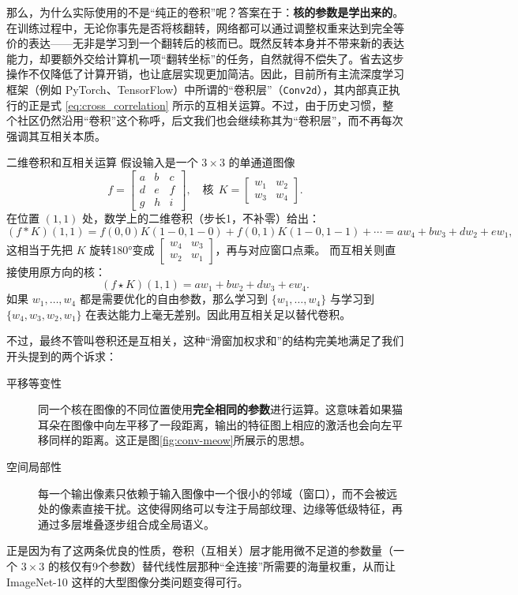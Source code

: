 \begin{framed}{}
那么，为什么实际使用的不是“纯正的卷积”呢？答案在于：\textbf{核的参数是学出来的}。在训练过程中，无论你事先是否将核翻转，网络都可以通过调整权重来达到完全等价的表达——无非是学习到一个翻转后的核而已。既然反转本身并不带来新的表达能力，却要额外交给计算机一项“翻转坐标”的任务，自然就得不偿失了。省去这步操作不仅降低了计算开销，也让底层实现更加简洁。因此，目前所有主流深度学习框架（例如 PyTorch、TensorFlow）中所谓的“卷积层”（\texttt{Conv2d}），其内部真正执行的正是式 \eqref{eq:cross_correlation} 所示的互相关运算\cite{dumoulin2018guideconvolutionarithmeticdeep}。不过，由于历史习惯，整个社区仍然沿用“卷积”这个称呼，后文我们也会继续称其为“卷积层”，而不再每次强调其互相关本质。
\end{framed}


\begin{example}{二维卷积和互相关运算}{}
假设输入是一个 $3\times 3$ 的单通道图像
\[
f = \begin{bmatrix}
a & b & c \\
d & e & f \\
g & h & i
\end{bmatrix}, \quad
\text{核}~~K = \begin{bmatrix}
w_1 & w_2 \\
w_3 & w_4
\end{bmatrix}.
\]
在位置 $(1,1)$ 处，数学上的二维卷积（步长1，不补零）给出：
\[
(f * K)(1,1) = f(0,0)K(1-0,1-0) + f(0,1)K(1-0,1-1) + \cdots 
= a w_4 + b w_3 + d w_2 + e w_1,
\]
这相当于先把 $K$ 旋转180°变成 $ \begin{bmatrix} w_4 & w_3 \\ w_2 & w_1 \end{bmatrix} $，再与对应窗口点乘。
而互相关则直接使用原方向的核：
\[
(f \star K)(1,1) = a w_1 + b w_2 + d w_3 + e w_4.
\]
如果 $w_1,\dots,w_4$ 都是需要优化的自由参数，那么学习到 $\{w_1,\dots,w_4\}$ 与学习到 $\{w_4,w_3,w_2,w_1\}$ 在表达能力上毫无差别。因此用互相关足以替代卷积。
\end{example}

不过，最终不管叫卷积还是互相关，这种“滑窗加权求和”的结构完美地满足了我们开头提到的两个诉求：
\begin{description}
    \item[平移等变性] 同一个核在图像的不同位置使用\textbf{完全相同的参数}进行运算。这意味着如果猫耳朵在图像中向左平移了一段距离，输出的特征图上相应的激活也会向左平移同样的距离。这正是图\cref{fig:conv-meow}所展示的思想。
    \item[空间局部性] 每一个输出像素只依赖于输入图像中一个很小的邻域（窗口），而不会被远处的像素直接干扰。这使得网络可以专注于局部纹理、边缘等低级特征，再通过多层堆叠逐步组合成全局语义。
\end{description}
正是因为有了这两条优良的性质，卷积（互相关）层才能用微不足道的参数量（一个 $3\times3$ 的核仅有9个参数）替代线性层那种“全连接”所需要的海量权重，从而让 ImageNet-10 这样的大型图像分类问题变得可行。


